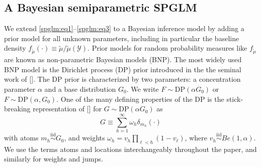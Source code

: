 \documentclass{article}[12pt]
\newcommand{\iid}{\stackrel{\mathrm{iid}}{\sim}}
\newcommand{\citeab}[1]{\citeauthor{#1} [\href{cite.#1}{\textcolor{blue}{\citeyear{#1}}}]}  %
\newcommand{\DP}{\mbox{DP}}
\newcommand{\tmu}{\widetilde{\mu}}
\newcommand{\sy}{\mathcal{Y}}
\renewcommand{\sy}{\mathcal{Y}}
\begin{document}
\subsection{A Bayesian semiparametric SPGLM}
\label{subsec:DPSPGLM}
We extend
\eqref{spglm:eq1}--\eqref{spglm:eq3} to a Bayesian inference model by
adding a prior model for all unknown parameters, including in
particular the baseline density $f_{\tmu}(\cdot) \equiv \tmu \big/\tmu(\sy)$.
Prior models for random probability measures like $f_{\tmu}$
are known as non-parametric Bayesian models (BNP).  The most widely
used BNP model is the Dirichlet process (DP) prior introduced in the
the seminal work of \citeab{ferguson1973bayesian}. 
The DP prior is characterized by two parameters: a
concentration parameter $\alpha$ and a base distribution $G_0$.
 We write  $F \sim \DP(\alpha G_0)$ or $F \sim \DP(\alpha,
G_0)$.  One of the many defining properties of the DP is the 
stick-breaking representation of 
\citeab{sethuraman1994constructive} for $G \sim \DP(\alpha G_0)$ as 
\begin{equation}
G \equiv \sum_{h=1}^\infty \omega_h \delta_{m_h}(\cdot)
\label{eq:stickb}
\end{equation}
with atoms $m_h \iid G_0$, and weights $\omega_h = v_h
\prod_{\ell<h}\left(1-v_{\ell}\right)$, where $v_h \iid Be(1,
\alpha)$. We use the terms atoms and locations
interchangeably throughout the paper, and similarly for weights and
jumps.  
\end{document}
